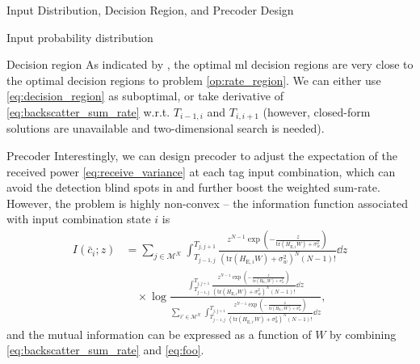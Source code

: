 \documentclass[journal]{IEEEtran}
\newtheorem{theorem}{Theorem}
\begin{document}
\begin{section}{Input Distribution, Decision Region, and Precoder Design}
\begin{subsection}{Input probability distribution}
		\end{subsection}


		\begin{subsection}{Decision region}
			As indicated by \cite{Qian2019b}, the optimal \gls{ml} decision regions are very close to the optimal decision regions to problem \eqref{op:rate_region}. We can either use \eqref{eq:decision_region} as suboptimal, or take derivative of \eqref{eq:backscatter_sum_rate} w.r.t. $T_{i-1,i}$ and $T_{i,i+1}$ (however, closed-form solutions are unavailable and two-dimensional search is needed).
		\end{subsection}

		\begin{subsection}{Precoder}
			Interestingly, we can design precoder to adjust the expectation of the received power \eqref{eq:receive_variance} at each tag input combination, which can avoid the detection blind spots in \cite{Qian2019} and further boost the weighted sum-rate. However, the problem is highly non-convex -- the information function associated with input combination state $i$ is
			\begin{align}
				I(\bar{c}_i;z)
				& = \sum_{j \in \mathcal{M^K}} \int_{T_{j-1,j}}^{T_{j,j+1}} \frac{z^{N-1} \exp \left(-\frac{z}{\mathrm{tr}(H_{\mathrm{E},i} W) + \sigma_w^2}\right)}{\left(\mathrm{tr}(H_{\mathrm{E},i} W) + \sigma_w^2\right)^N (N-1)!} \dd z\nonumber\\
				& \quad \times \log \frac{\int_{T_{j-1,j}}^{T_{j,j+1}} \frac{z^{N-1} \exp \left(-\frac{z}{\mathrm{tr}(H_{\mathrm{E},i} W) + \sigma_w^2}\right)}{\left(\mathrm{tr}(H_{\mathrm{E},i} W) + \sigma_w^2\right)^N (N-1)!} \dd z}{\sum_{i' \in \mathcal{M^K}} \int_{T_{j-1,j}}^{T_{j,j+1}} \frac{z^{N-1} \exp \left(-\frac{z}{\mathrm{tr}(H_{\mathrm{E},i'} W) + \sigma_w^2}\right)}{\left(\mathrm{tr}(H_{\mathrm{E},i'} W) + \sigma_w^2\right)^N (N-1)!} \dd z},
				\label{eq:foo}
			\end{align}
			and the mutual information can be expressed as a function of $W$ by combining \eqref{eq:backscatter_sum_rate} and \eqref{eq:foo}.


\end{subsection}
\end{section}
\end{document}
